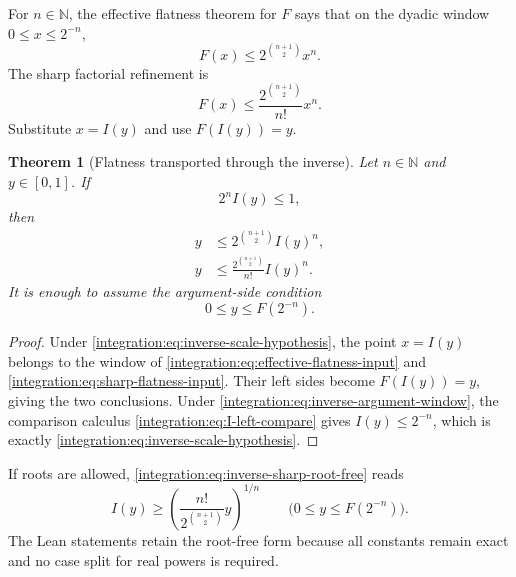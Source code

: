 \documentclass[11pt,oneside]{article}
\newtheorem{theorem}{Theorem}[section]
\theoremstyle{definition}
\theoremstyle{remark}
\newcommand{\N}{\mathbb N}
\begin{document}
For $n\in\N$, the effective flatness theorem for $F$ says that on the dyadic window
$0\le x\le2^{-n}$,
\begin{equation}
 F(x)\le 2^{\binom{n+1}{2}}x^n.
 \label{integration:eq:effective-flatness-input}
\end{equation}
The sharp factorial refinement is
\begin{equation}
 F(x)\le \frac{2^{\binom{n+1}{2}}}{n!}x^n.
 \label{integration:eq:sharp-flatness-input}
\end{equation}
Substitute $x=I(y)$ and use $F(I(y))=y$.

\begin{theorem}[Flatness transported through the inverse]
\label{integration:thm:inverse-root-free}
Let $n\in\N$ and $y\in[0,1]$.  If
\begin{equation}
 2^n I(y)\le1,
 \label{integration:eq:inverse-scale-hypothesis}
\end{equation}
then
\begin{align}
 y&\le 2^{\binom{n+1}{2}}I(y)^n,                            \label{integration:eq:inverse-basic-root-free}\\
 y&\le \frac{2^{\binom{n+1}{2}}}{n!}I(y)^n.                \label{integration:eq:inverse-sharp-root-free}
\end{align}
It is enough to assume the argument-side condition
\begin{equation}
 0\le y\le F(2^{-n}).
 \label{integration:eq:inverse-argument-window}
\end{equation}
\end{theorem}

\begin{proof}
Under \eqref{integration:eq:inverse-scale-hypothesis}, the point $x=I(y)$ belongs to the window of
\eqref{integration:eq:effective-flatness-input} and \eqref{integration:eq:sharp-flatness-input}.  Their left sides
become $F(I(y))=y$, giving the two conclusions.  Under
\eqref{integration:eq:inverse-argument-window}, the comparison calculus
\eqref{integration:eq:I-left-compare} gives $I(y)\le2^{-n}$, which is exactly
\eqref{integration:eq:inverse-scale-hypothesis}.
\end{proof}

If roots are allowed, \eqref{integration:eq:inverse-sharp-root-free} reads
\begin{equation}
 I(y)\ge
 \left(\frac{n!}{2^{\binom{n+1}{2}}}y\right)^{1/n}
 \qquad\bigl(0\le y\le F(2^{-n})\bigr).
 \label{integration:eq:inverse-root-form}
\end{equation}
The Lean statements retain the root-free form because all constants remain exact and no
case split for real powers is required.
\end{document}

